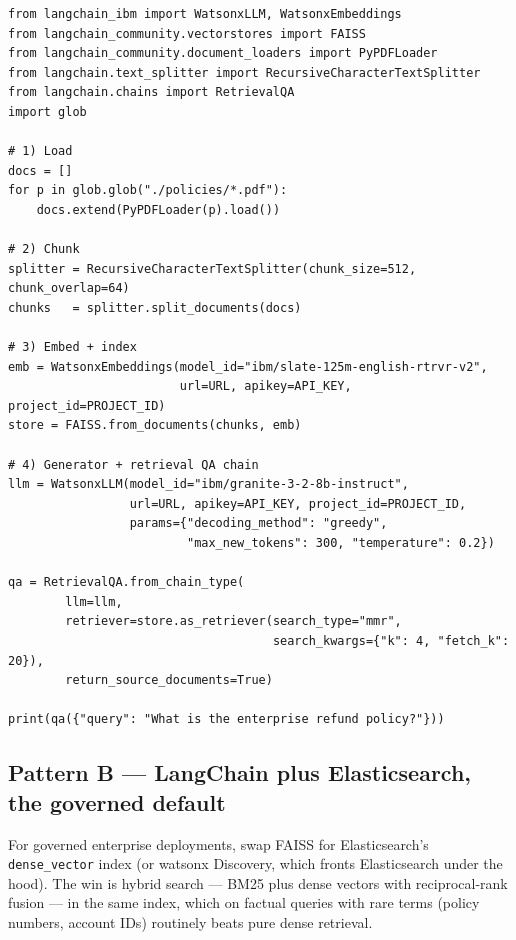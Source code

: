 \begin{examplebox}[title=\textbf{End-to-end RAG with LangChain and watsonx}]
\begin{lstlisting}[style=pythonstyle]
from langchain_ibm import WatsonxLLM, WatsonxEmbeddings
from langchain_community.vectorstores import FAISS
from langchain_community.document_loaders import PyPDFLoader
from langchain.text_splitter import RecursiveCharacterTextSplitter
from langchain.chains import RetrievalQA
import glob

# 1) Load
docs = []
for p in glob.glob("./policies/*.pdf"):
    docs.extend(PyPDFLoader(p).load())

# 2) Chunk
splitter = RecursiveCharacterTextSplitter(chunk_size=512, chunk_overlap=64)
chunks   = splitter.split_documents(docs)

# 3) Embed + index
emb = WatsonxEmbeddings(model_id="ibm/slate-125m-english-rtrvr-v2",
                        url=URL, apikey=API_KEY, project_id=PROJECT_ID)
store = FAISS.from_documents(chunks, emb)

# 4) Generator + retrieval QA chain
llm = WatsonxLLM(model_id="ibm/granite-3-2-8b-instruct",
                 url=URL, apikey=API_KEY, project_id=PROJECT_ID,
                 params={"decoding_method": "greedy",
                         "max_new_tokens": 300, "temperature": 0.2})

qa = RetrievalQA.from_chain_type(
        llm=llm,
        retriever=store.as_retriever(search_type="mmr",
                                     search_kwargs={"k": 4, "fetch_k": 20}),
        return_source_documents=True)

print(qa({"query": "What is the enterprise refund policy?"}))
\end{lstlisting}
\end{examplebox}

\subsection{Pattern B --- LangChain plus Elasticsearch, the governed default}

For governed enterprise deployments, swap FAISS for Elasticsearch's \texttt{dense\_vector} index (or watsonx Discovery, which fronts Elasticsearch under the hood). The win is hybrid search --- BM25 plus dense vectors with reciprocal-rank fusion --- in the same index, which on factual queries with rare terms (policy numbers, account IDs) routinely beats pure dense retrieval.

